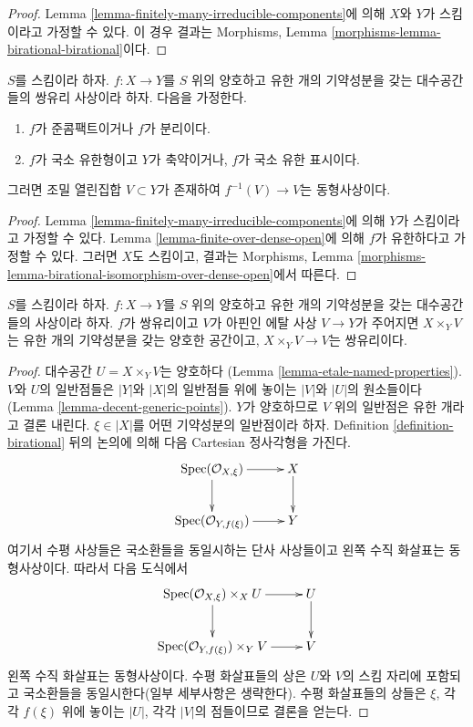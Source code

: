 \begin{proof}
Lemma \ref{lemma-finitely-many-irreducible-components}에 의해 $X$와
$Y$가 스킴이라고 가정할 수 있다. 이 경우 결과는 Morphisms, Lemma
\ref{morphisms-lemma-birational-birational}이다.
\end{proof}

\begin{lemma}
\label{lemma-birational-isomorphism-over-dense-open}
$S$를 스킴이라 하자. $f : X \to Y$를 $S$ 위의 양호하고 유한 개의
기약성분을 갖는 대수공간들의 쌍유리 사상이라 하자. 다음을 가정한다.
\begin{enumerate}
\item $f$가 준콤팩트이거나 $f$가 분리이다.
\item $f$가 국소 유한형이고 $Y$가 축약이거나, $f$가 국소 유한
표시이다.
\end{enumerate}
그러면 조밀 열린집합 $V \subset Y$가 존재하여
$f^{-1}(V) \to V$는 동형사상이다.
\end{lemma}

\begin{proof}
Lemma \ref{lemma-finitely-many-irreducible-components}에 의해 $Y$가
스킴이라고 가정할 수 있다. Lemma \ref{lemma-finite-over-dense-open}에
의해 $f$가 유한하다고 가정할 수 있다. 그러면 $X$도 스킴이고, 결과는
Morphisms, Lemma
\ref{morphisms-lemma-birational-isomorphism-over-dense-open}에서
따른다.
\end{proof}

\begin{lemma}
\label{lemma-birational-etale-localization}
$S$를 스킴이라 하자. $f : X \to Y$를 $S$ 위의 양호하고 유한 개의
기약성분을 갖는 대수공간들의 사상이라 하자. $f$가 쌍유리이고
$V$가 아핀인 에탈 사상 $V \to Y$가 주어지면
$X \times_Y V$는 유한 개의 기약성분을 갖는 양호한 공간이고,
$X \times_Y V \to V$는 쌍유리이다.
\end{lemma}

\begin{proof}
대수공간 $U = X \times_Y V$는 양호하다
(Lemma \ref{lemma-etale-named-properties}).
$V$와 $U$의 일반점들은 $|Y|$와 $|X|$의 일반점들 위에 놓이는
$|V|$와 $|U|$의 원소들이다
(Lemma \ref{lemma-decent-generic-points}).
$Y$가 양호하므로 $V$ 위의 일반점은 유한 개라고 결론 내린다.
$\xi \in |X|$를 어떤 기약성분의 일반점이라 하자.
Definition \ref{definition-birational} 뒤의 논의에 의해 다음 Cartesian
정사각형을 가진다.
$$
\xymatrix{
\Spec(\mathcal{O}_{X, \xi}) \ar[d] \ar[r] & X \ar[d] \\
\Spec(\mathcal{O}_{Y, f(\xi)}) \ar[r] & Y
}
$$
여기서 수평 사상들은 국소환들을 동일시하는 단사 사상들이고 왼쪽
수직 화살표는 동형사상이다. 따라서 다음 도식에서
$$
\xymatrix{
\Spec(\mathcal{O}_{X, \xi}) \times_X U \ar[d] \ar[r] & U \ar[d] \\
\Spec(\mathcal{O}_{Y, f(\xi)}) \times_Y V \ar[r] & V
}
$$
왼쪽 수직 화살표는 동형사상이다. 수평 화살표들의 상은 $U$와 $V$의
스킴 자리에 포함되고 국소환들을 동일시한다(일부 세부사항은 생략한다).
수평 화살표들의 상들은 $\xi$, 각각 $f(\xi)$ 위에 놓이는
$|U|$, 각각 $|V|$의 점들이므로 결론을 얻는다.
\end{proof}

